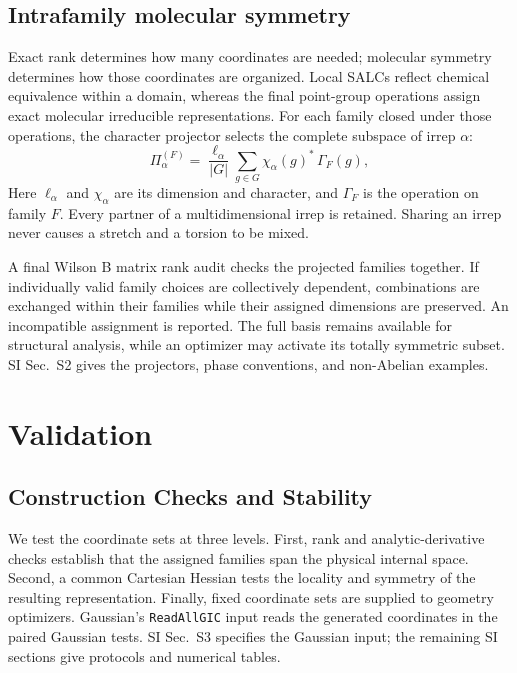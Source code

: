 \documentclass[journal=jctcce,manuscript=article,layout=traditional]{achemso}
\theoremstyle{definition}
\begin{document}
\subsection{Intrafamily molecular symmetry}

{Exact rank determines how many coordinates are needed; molecular symmetry
determines how those coordinates are organized. Local SALCs reflect chemical
equivalence within a domain, whereas the final point-group operations assign
exact molecular irreducible representations. For each family closed under
those operations, the character projector selects the complete subspace of
irrep \(\alpha\):}
{
\begin{equation}
 \Pi_\alpha^{(F)}=
 \frac{\ell_\alpha}{|G|}
 \sum_{g\in G}\chi_\alpha(g)^*\,\Gamma_F(g),
 \label{eq:family-symmetry-projector}
\end{equation}
}
{Here \(\ell_\alpha\) and \(\chi_\alpha\) are its dimension and character,
and \(\Gamma_F\) is the operation on family \(F\). Every partner of a
multidimensional irrep is retained. Sharing an irrep never causes a stretch
and a torsion to be mixed.}

{A final Wilson B matrix rank audit checks the projected
families together. If individually valid family choices are collectively
dependent, combinations are exchanged within their families while their
assigned dimensions are preserved. An incompatible assignment is reported.
The full basis remains available for structural analysis, while an optimizer
may activate its totally symmetric subset. SI Sec.~S2 gives the projectors,
phase conventions, and non-Abelian examples.}
\section{Validation}
\label{sec:validation}

\subsection{Construction Checks and Stability}
\label{sec:construction-stability}

{We test the coordinate sets at three levels.  First, rank
and analytic-derivative checks establish that the assigned families span the
physical internal space.  Second, a common Cartesian Hessian tests the
locality and symmetry of the resulting representation.  Finally, fixed
coordinate sets are supplied to geometry optimizers.  Gaussian's
\texttt{ReadAllGIC} input reads the generated coordinates in the
paired Gaussian tests.\cite{GaussianGICManual} SI Sec.~S3 specifies the
Gaussian input; the remaining SI sections give protocols and numerical tables.}
\end{document}

